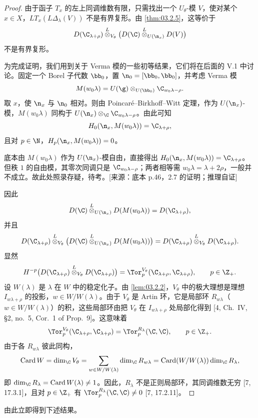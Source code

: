 \begin{proof}
由于函子 $T_x$ 的左上同调维数有限，只需找出一个 $U_\theta$-模 $V$，使对某个 $x\in X$，$LT_x(L\Delta_\lambda(V))$ 不是有界复形。由 \ref{thm:03.2.5}，这等价于
$$D(\C_{\lambda+\rho})\overset{L}{\otimes}_{V_\theta}\bigl(D(\C)\overset{L}{\otimes}_{U(\n_x)}D(V)\bigr)$$
不是有界复形。

为完成证明，我们用到关于 Verma 模的一些初等结果，它们将在后面的 V.1 中讨论。固定一个 Borel 子代数 $\bb_0$，置 $\n_0=[\bb_0,\bb_0]$，并考虑 Verma 模
$$M(w_0\lambda)=U(\g)\otimes_{U(\bb_0)}\C_{w_0\lambda-\rho}.$$
取 $x$，使 $\n_x$ 与 $\n_0$ 相对。则由 Poincaré--Birkhoff--Witt 定理，作为 $U(\n_x)$-模，$M(w_0\lambda)$ 同构于 $U(\n_x)\otimes_\C\C_{w_0\lambda-\rho}$。由此可知
$$H_0(\n_x,M(w_0\lambda))=\C_{\lambda+\rho},$$
且对 $p\in\N$，$H_p(\n_x,M(w_0\lambda))=0$。
\begin{annote}
底本由 $M(w_0\lambda)$ 作为 $U(\n_x)$-模自由，直接得出 $H_0(\n_x,M(w_0\lambda))=\C_{\lambda+\rho}$。但秩 $1$ 的自由模，其零次同调只是 $\C_{w_0\lambda-\rho}$；两者相等需 $w_0\lambda=\lambda+2\rho$，一般并不成立。故此处照录存疑，待考。[来源：底本 p.46，2.7 的证明；推理自证]
\end{annote}
因此
$$D(\C)\overset{L}{\otimes}_{U(\n_x)}D(M(w_0\lambda))=D(\C_{\lambda+\rho}),$$
并且
$$D(\C_{\lambda+\rho})\overset{L}{\otimes}_{V_\theta}\bigl(D(\C)\overset{L}{\otimes}_{U(\n_x)}D(M(w_0\lambda))\bigr)=D(\C_{\lambda+\rho})\overset{L}{\otimes}_{V_\theta}D(\C_{\lambda+\rho}).$$
显然
$$H^{-p}\bigl(D(\C_{\lambda+\rho})\overset{L}{\otimes}_{V_\theta}D(\C_{\lambda+\rho})\bigr)=\Tor_p^{V_\theta}(\C_{\lambda+\rho},\C_{\lambda+\rho}),\qquad p\in\Z_+.$$
设 $W(\lambda)$ 是 $\lambda$ 在 $W$ 中的稳定化子。由 \ref{lem:03.2.2}，$V_\theta$ 中的极大理想是理想 $I_{w\lambda+\rho}$ 的投影，$w\in W/W(\lambda)$。由于 $V_\theta$ 是 Artin 环，它是局部环 $R_{w\lambda}$（$w\in W/W(\lambda)$）的积，这些局部环由把 $V_\theta$ 在 $I_{w\lambda+\rho}$ 处局部化得到 [4, Ch.~IV, \S2, no.~5, Cor.~1 of Prop.~9]。这意味着
$$\Tor_p^{V_\theta}(\C_{\lambda+\rho},\C_{\lambda+\rho})=\Tor_p^{R_\lambda}(\C,\C),\qquad p\in\Z_+.$$
由于各 $R_{w\lambda}$ 彼此同构，
$$\operatorname{Card}W=\dim_\C V_\theta=\sum_{w\in W/W(\lambda)}\dim_\C R_{w\lambda}=\operatorname{Card}(W/W(\lambda))\dim_\C R_\lambda,$$
即 $\dim_\C R_\lambda=\operatorname{Card}W(\lambda)\ne 1$。因此，$R_\lambda$ 不是正则局部环，其同调维数无穷 [7, 17.3.1]，且对 $p\in\Z_+$ 有 $\Tor_p^{R_\lambda}(\C,\C)\ne 0$ [7, 17.2.11]。
\end{proof}

由此立即得到下述结果。

